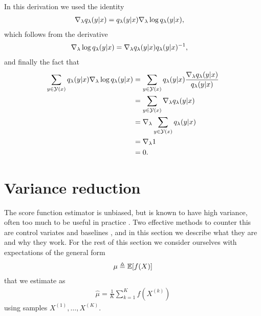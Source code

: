   In this derivation we used the identity
  \begin{align*}
    \nabla_{\lambda} q_{\lambda}(y | x) &= q_{\lambda}(y | x)\nabla_{\lambda}\log q_{\lambda}(y | x),
  \end{align*}
  which follows from the derivative
  \begin{align*}
    \nabla_{\lambda}\log q_{\lambda}(y | x) &= \nabla_{\lambda} q_{\lambda}(y | x)q_{\lambda}(y | x)^{-1},
  \end{align*}
  and finally the fact that
  \begin{align*}
    \sum_{y \in \mathcal{Y}(x)} q_{\lambda}(y | x)\nabla_{\lambda}\log q_{\lambda}(y | x)
      &= \sum_{y \in \mathcal{Y}(x)}  q_{\lambda}(y | x) \frac{\nabla_{\lambda} q_{\lambda}(y | x)}{q_{\lambda}(y | x)}  \\
      &= \sum_{y \in \mathcal{Y}(x)} \nabla_{\lambda} q_{\lambda}(y | x) \\
      &= \nabla_{\lambda} \sum_{y \in \mathcal{Y}(x)} q_{\lambda}(y | x)\\
      &= \nabla_{\lambda} 1 \\
      &= 0. \\
  \end{align*}

\section{Variance reduction}
  The  score function estimator is unbiased, but is known to have high variance, often too much to be useful in practice \citep{paisley2012viss}. Two effective methods to counter this are control variates and baselines \citep{ross2006simulation}, and in this section we describe what they are and why they work. For the rest of this section we consider ourselves with expectations of the general form
  \begin{align*}
    \mu \triangleq \operatorname{\mathbb{E}} [ f(X) ]
  \end{align*}
  that we estimate as
  \begin{align*}
    \hat{\mu} = \frac{1}{K} \sum_{k=1}^K f(X^{(k)})
  \end{align*}
  using samples $X^{(1)}, \dots, X^{(K)}$.

